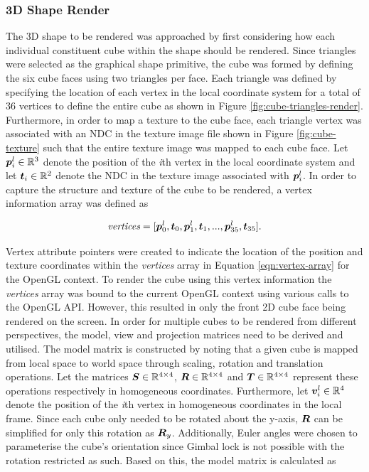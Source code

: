 
\subsubsection{3D Shape Render}

The 3D shape to be rendered was approached by first considering how each individual constituent cube within the shape should be rendered. Since triangles were selected as the graphical shape primitive, the cube was formed by defining the six cube faces using two triangles per face. Each triangle was defined by specifying the location of each vertex in the local coordinate system for a total of 36 vertices to define the entire cube as shown in Figure \ref{fig:cube-triangles-render}. Furthermore, in order to map a texture to the cube face, each triangle vertex was associated with an NDC in the texture image file shown in Figure \ref{fig:cube-texture} such that the entire texture image was mapped to each cube face. Let $\bm{p}^l_i\in\mathbb{R}^3$ denote the position of the \textit{i}th vertex in the local coordinate system and let $\bm{t}_i\in\mathbb{R}^2$ denote the NDC in the texture image associated with $\bm{p}^l_i$. In order to capture the structure and texture of the cube to be rendered, a vertex information array was defined as

\begin{equation}
	\textit{vertices}=[\bm{p}^l_0, \bm{t}_0, \bm{p}^l_1, \bm{t}_1,...,\bm{p}^l_{35}, \bm{t}_{35}].
	\label{eqn:vertex-array}
\end{equation}

Vertex attribute pointers were created to indicate the location of the position and texture coordinates within the \textit{vertices} array in Equation \ref{eqn:vertex-array} for the OpenGL context. To render the cube using this vertex information the \textit{vertices} array was bound to the current OpenGL context using various calls to the OpenGL API. However, this resulted in only the front 2D cube face being rendered on the screen. In order for multiple cubes to be rendered from different perspectives, the model, view and projection matrices need to be derived and utilised. The model matrix is constructed by noting that a given cube is mapped from local space to world space through scaling, rotation and translation operations. Let the matrices $\bm{S}\in\mathbb{R}^{4\times4}$, $\bm{R}\in\mathbb{R}^{4\times4}$ and $\bm{T}\in\mathbb{R}^{4\times4}$ represent these operations respectively in homogeneous coordinates. Furthermore, let $\bm{v}^l_i\in\mathbb{R}^4$ denote the position of the \textit{i}th vertex in homogeneous coordinates in the local frame. Since each cube only needed to be rotated about the y-axis, $\bm{R}$ can be simplified for only this rotation as $\bm{R}_y$. Additionally, Euler angles were chosen to parameterise the cube's orientation since Gimbal lock is not possible with the rotation restricted as such. Based on this, the model matrix is calculated as

